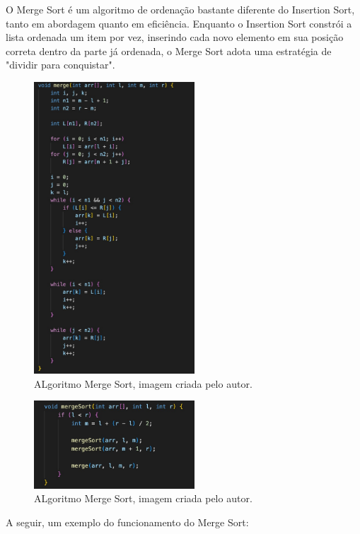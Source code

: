 O Merge Sort é um algoritmo de ordenação bastante diferente do Insertion Sort, tanto em abordagem quanto em eficiência. Enquanto o Insertion Sort constrói a lista ordenada um item por vez, inserindo cada novo elemento em sua posição correta dentro da parte já ordenada, o Merge Sort adota uma estratégia de "dividir para conquistar"\cite{cyberini2018mergesort}.

 \begin{figure}[H]
    \centering
    \includegraphics[width = 6cm]{Imagens/Merge Sort/WhatsApp Image 2023-11-13 at 21.41.34.jpeg}
    \caption{ALgoritmo Merge Sort, imagem criada pelo autor. }
    \label{imagem_merge}
\end{figure}

 \begin{figure}[H]
    \centering
    \includegraphics[width = 6cm]{Imagens/Merge Sort/WhatsApp Image 2023-11-13 at 21.41.34 (1).jpeg}
    \caption{ALgoritmo Merge Sort, imagem criada pelo autor. }
    \label{imagem_merge}
\end{figure}

\par A seguir, um exemplo do funcionamento do Merge Sort:

